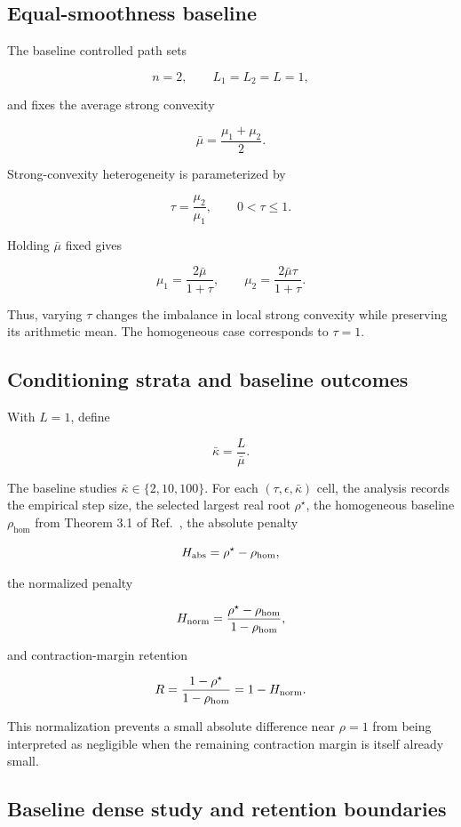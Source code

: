 \subsection{Equal-smoothness baseline}

The baseline controlled path sets

\[
n=2,\qquad L_1=L_2=L=1,
\]

and fixes the average strong convexity

\[
\bar\mu=\frac{\mu_1+\mu_2}{2}.
\]

Strong-convexity heterogeneity is parameterized by

\[
\tau=\frac{\mu_2}{\mu_1},\qquad 0<\tau\le 1.
\]

Holding $\bar{\mu}$ fixed gives

\[
\mu_1=\frac{2\bar\mu}{1+\tau},
\qquad
\mu_2=\frac{2\bar\mu\tau}{1+\tau}.
\]

Thus, varying $\tau$ changes the imbalance in local strong convexity while preserving its arithmetic mean. The homogeneous case corresponds to $\tau=1$.

\subsection{Conditioning strata and baseline outcomes}

With $L=1$, define

\[
\bar\kappa=\frac{L}{\bar\mu}.
\]

The baseline studies $\bar{\kappa}\in \{2,10,100\}$. For each $(\tau,\epsilon,\bar{\kappa})$ cell, the analysis records the empirical step size, the selected largest real root $\rho^\star$, the homogeneous baseline $\rho_{\mathrm{hom}}$ from Theorem 3.1 of Ref.~\cite{thomsen2026tight}, the absolute penalty

\[
H_{\rm abs}=\rho^\star-\rho_{\mathrm{hom}},
\]

the normalized penalty

\[
H_{\rm norm}=
\frac{\rho^\star-\rho_{\mathrm{hom}}}
{1-\rho_{\mathrm{hom}}},
\]

and contraction-margin retention

\[
R=
\frac{1-\rho^\star}
{1-\rho_{\mathrm{hom}}}
=1-H_{\rm norm}.
\]

This normalization prevents a small absolute difference near $\rho=1$ from being interpreted as negligible when the remaining contraction margin is itself already small.

\subsection{Baseline dense study and retention boundaries}

